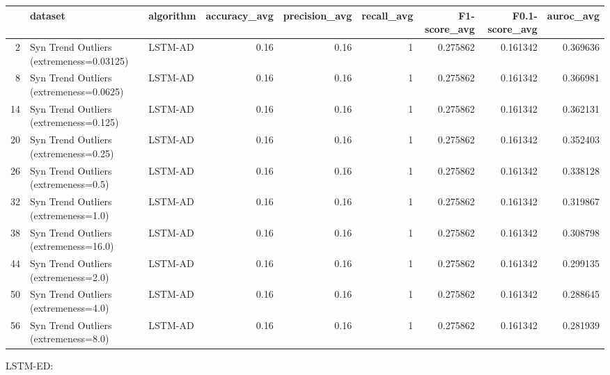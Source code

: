 \begin{tabular}{rllrrrrrr}
\hline
    & dataset                                  & algorithm   &   accuracy\_avg &   precision\_avg &   recall\_avg &   F1-score\_avg &   F0.1-score\_avg &   auroc\_avg \\
\hline
  2 & Syn Trend Outliers (extremeness=0.03125) & LSTM-AD     &           0.16 &            0.16 &            1 &       0.275862 &         0.161342 &    0.369636 \\
  8 & Syn Trend Outliers (extremeness=0.0625)  & LSTM-AD     &           0.16 &            0.16 &            1 &       0.275862 &         0.161342 &    0.366981 \\
 14 & Syn Trend Outliers (extremeness=0.125)   & LSTM-AD     &           0.16 &            0.16 &            1 &       0.275862 &         0.161342 &    0.362131 \\
 20 & Syn Trend Outliers (extremeness=0.25)    & LSTM-AD     &           0.16 &            0.16 &            1 &       0.275862 &         0.161342 &    0.352403 \\
 26 & Syn Trend Outliers (extremeness=0.5)     & LSTM-AD     &           0.16 &            0.16 &            1 &       0.275862 &         0.161342 &    0.338128 \\
 32 & Syn Trend Outliers (extremeness=1.0)     & LSTM-AD     &           0.16 &            0.16 &            1 &       0.275862 &         0.161342 &    0.319867 \\
 38 & Syn Trend Outliers (extremeness=16.0)    & LSTM-AD     &           0.16 &            0.16 &            1 &       0.275862 &         0.161342 &    0.308798 \\
 44 & Syn Trend Outliers (extremeness=2.0)     & LSTM-AD     &           0.16 &            0.16 &            1 &       0.275862 &         0.161342 &    0.299135 \\
 50 & Syn Trend Outliers (extremeness=4.0)     & LSTM-AD     &           0.16 &            0.16 &            1 &       0.275862 &         0.161342 &    0.288645 \\
 56 & Syn Trend Outliers (extremeness=8.0)     & LSTM-AD     &           0.16 &            0.16 &            1 &       0.275862 &         0.161342 &    0.281939 \\
\hline
\end{tabular}

LSTM-ED:

